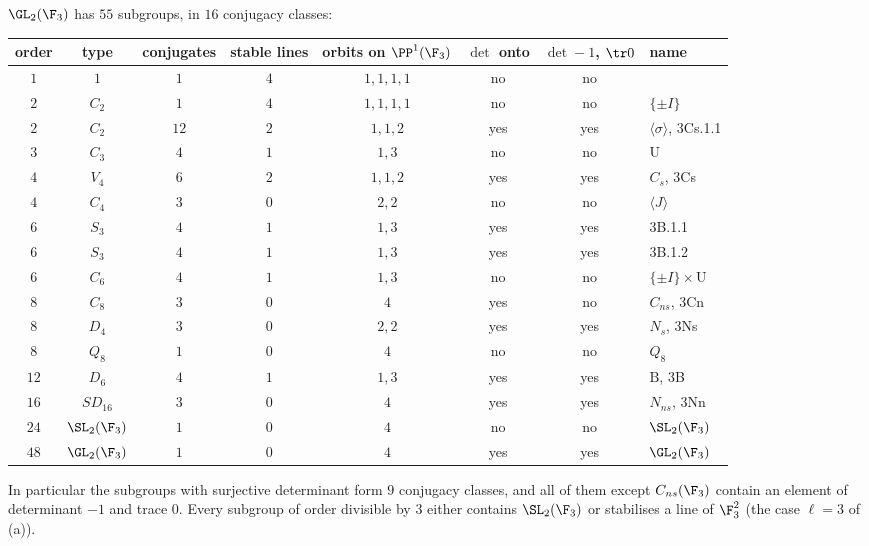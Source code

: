 \begin{proposition}[Subgroups of $\GL_2(\F_3)$]\label{prop:groups:gl23subgroups}
$\GL_2(\F_3)$ has $55$ subgroups, in $16$ conjugacy classes:
\begin{center}
\small
\setlength{\tabcolsep}{4.5pt}
\begin{tabular}{cccccccl}
\toprule
order & type & conjugates & stable lines & orbits on $\PP^1(\F_3)$ & $\det$ onto & $\det -1$, $\tr 0$ & name\\
\midrule
$1$ & $1$ & $1$ & $4$ & $1,1,1,1$ & no & no & \\
$2$ & $C_2$ & $1$ & $4$ & $1,1,1,1$ & no & no & $\{\pm I\}$\\
$2$ & $C_2$ & $12$ & $2$ & $1,1,2$ & yes & yes & $\langle\sigma\rangle$, 3Cs.1.1\\
$3$ & $C_3$ & $4$ & $1$ & $1,3$ & no & no & $\mathrm U$\\
$4$ & $V_4$ & $6$ & $2$ & $1,1,2$ & yes & yes & $C_s$, 3Cs\\
$4$ & $C_4$ & $3$ & $0$ & $2,2$ & no & no & $\langle J\rangle$\\
$6$ & $S_3$ & $4$ & $1$ & $1,3$ & yes & yes & 3B.1.1\\
$6$ & $S_3$ & $4$ & $1$ & $1,3$ & yes & yes & 3B.1.2\\
$6$ & $C_6$ & $4$ & $1$ & $1,3$ & no & no & $\{\pm I\}\times\mathrm U$\\
$8$ & $C_8$ & $3$ & $0$ & $4$ & yes & no & $C_{ns}$, 3Cn\\
$8$ & $D_4$ & $3$ & $0$ & $2,2$ & yes & yes & $N_s$, 3Ns\\
$8$ & $Q_8$ & $1$ & $0$ & $4$ & no & no & $Q_8$\\
$12$ & $D_6$ & $4$ & $1$ & $1,3$ & yes & yes & $\mathrm B$, 3B\\
$16$ & $SD_{16}$ & $3$ & $0$ & $4$ & yes & yes & $N_{ns}$, 3Nn\\
$24$ & $\SL_2(\F_3)$ & $1$ & $0$ & $4$ & no & no & $\SL_2(\F_3)$\\
$48$ & $\GL_2(\F_3)$ & $1$ & $0$ & $4$ & yes & yes & $\GL_2(\F_3)$\\
\bottomrule
\end{tabular}
\end{center}
In particular the subgroups with surjective determinant form $9$ conjugacy classes, and all of them except $C_{ns}(\F_3)$ contain an element of
determinant $-1$ and trace $0$. Every subgroup of order divisible by $3$ either contains $\SL_2(\F_3)$ or stabilises a line of $\F_3^2$ (the case $\ell=3$ of
(a)).
\end{proposition}

